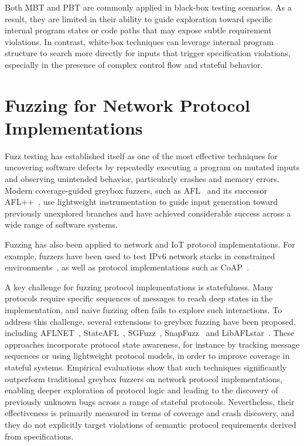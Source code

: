 Both MBT and PBT are commonly applied in black-box testing scenarios.
As a result, they are limited in their ability to guide exploration toward specific internal program states or code paths that may expose subtle requirement violations.
In contrast, white-box techniques can leverage internal program structure to search more directly for inputs that trigger specification violations, especially in the presence of complex control flow and stateful behavior.

\section{Fuzzing for Network Protocol Implementations}
Fuzz testing has established itself as one of the most effective techniques for uncovering software defects by repeatedly executing a program on mutated inputs and observing unintended behavior, particularly crashes and memory errors.
Modern coverage-guided greybox fuzzers, such as AFL~\cite{AFL} and its successor AFL++~\cite{AFLplusplus-Woot20}, use lightweight instrumentation to guide input generation toward previously unexplored branches and have achieved considerable success across a wide range of software systems.

Fuzzing has also been applied to network and IoT protocol implementations.
For example, fuzzers have been used to test IPv6 network stacks in constrained environments~\cite{SoManyFuzzers@ASE-22}, as well as protocol implementations such as CoAP~\cite{liljedahl19,melo-17,zeng-20}.

A key challenge for fuzzing protocol implementations is statefulness.
Many protocols require specific sequences of messages to reach deep states in the implementation, and naive fuzzing often fails to explore such interactions.
To address this challenge, several extensions to greybox fuzzing have been proposed, including AFLNET~\cite{AFLNET@ICST-20}, StateAFL~\cite{StateAFL@EmpirSoftEng-22}, SGFuzz~\cite{SGFuzz@USENIX-22}, SnapFuzz~\cite{SnapFuzz@ISSTA-22} and LibAFLstar~\cite{LibAFLStar@2025}.
These approaches incorporate protocol state awareness, for instance by tracking message sequences or using lightweight protocol models, in order to improve coverage in stateful systems.
Empirical evaluations show that such techniques significantly outperform traditional greybox fuzzers on network protocol implementations, enabling deeper exploration of protocol logic and leading to the discovery of previously unknown bugs across a range of stateful protocols.
Nevertheless, their effectiveness is primarily measured in terms of coverage and crash discovery, and they do not explicitly target violations of semantic protocol requirements derived from specifications.

